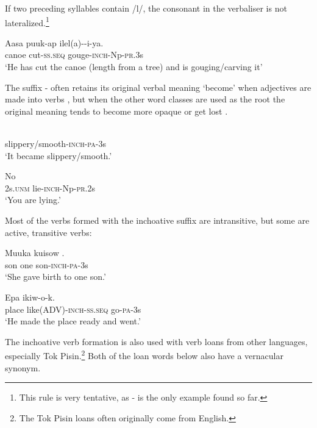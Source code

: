 If two preceding syllables contain /l/, the consonant in the verbaliser is not lateralized.\footnote{This rule is very tentative, as - is the only example found so far.}

\ea%
\label{ex:3:x200}
\gll Aasa puuk-ap ilel(a)--i-ya. \\
canoe cut-\textsc{ss}.\textsc{seq} gouge-\textsc{inch}-Np-\textsc{pr}.3s \\
\glt`He has cut the canoe (length from a tree) and is gouging/carving it' 
\z

The suffix - often retains its original verbal meaning `become' when adjectives are made into verbs , but when the other word classes are used as the root the original meaning tends to become more opaque or get lost . 

\ea%
\label{ex:3:x201}
\gll {} \\
slippery/smooth-\textsc{inch}-\textsc{pa}-3s \\
\glt`It became slippery/smooth.' 
\z

\ea%
\label{ex:3:x202}
\gll No  \\
2s.\textsc{unm} lie-\textsc{inch}-Np-\textsc{pr}.2s \\
\glt`You are lying.' 
\z

Most of the verbs formed with the inchoative suffix are intransitive, but some are active, transitive verbs:

\ea%
\label{ex:3:x203}
\gll Muuka kuisow . \\
son one son-\textsc{inch}-\textsc{pa}-3s \\
\glt`She gave birth to one son.'
\z

\ea%
\label{ex:3:x204}
\gll Epa  ikiw-o-k. \\
place like(ADV)-\textsc{inch}-\textsc{ss}.\textsc{seq} go-\textsc{pa}-3s \\
\glt`He made the place ready and went.'
\z

The inchoative verb formation is also used with verb loans from other languages, especially Tok Pisin.\footnote{The Tok Pisin loans often originally come from English.} Both of the loan words below also have a vernacular synonym.


